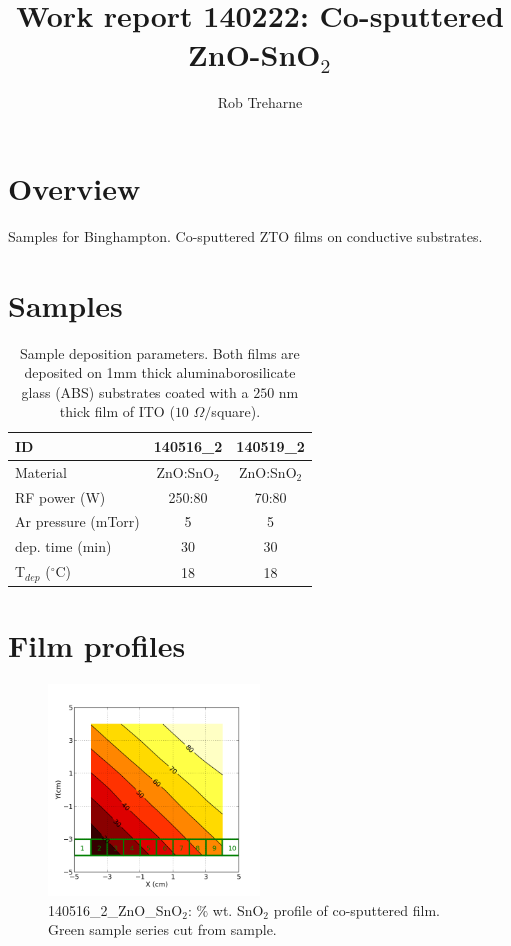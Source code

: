 \documentclass{article}
\title{Work report 140222: Co-sputtered ZnO-SnO$_2$}
\author{Rob Treharne}
\begin{document}
\maketitle

\section{Overview}

Samples for Binghampton. Co-sputtered ZTO films on conductive substrates.


\section{Samples}

\begin{table}[h!]
\caption{Sample deposition parameters. Both films are deposited on 1mm thick aluminaborosilicate glass (ABS) substrates coated with a $250$ nm thick film of ITO ($10$ $\Omega/$square).}
\centering
\begin{tabular}{l|cc}
\hline\hline
 ID & 140516\_2 & 140519\_2 \\
\hline
Material & ZnO:SnO$_2$ & ZnO:SnO$_2$ \\
RF power (W) & 250:80 & 70:80 \\
Ar pressure (mTorr) & 5 & 5 \\
dep. time (min) & 30 & 30 \\
T$_{dep}$ ($^{\circ}$C) & 18 & 18 \\
\hline
\end{tabular}
\end{table}




\section{Film profiles}

\begin{figure}[ht]
\centering
\includegraphics[width=0.5\textwidth]{140519_2_ZnO_SnO2_pieces_250-80.png}
\caption{\label{fig:3} 140516\_2\_ZnO\_SnO$_2$: $\%$ wt. SnO$_2$ profile of co-sputtered film. Green sample series cut from sample.}
\end{figure}
\end{document}

